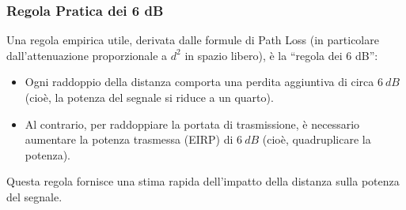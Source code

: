 \subsubsection{Regola Pratica dei 6 dB}
Una regola empirica utile, derivata dalle formule di Path Loss (in particolare dall'attenuazione proporzionale a $d^2$ in spazio libero), è la ``regola dei 6 dB'':
\begin{itemize}
    \item Ogni raddoppio della distanza comporta una perdita aggiuntiva di circa $\SI{6}{dB}$ (cioè, la potenza del segnale si riduce a un quarto).
    \item Al contrario, per raddoppiare la portata di trasmissione, è necessario aumentare la potenza trasmessa (EIRP) di $\SI{+6}{dB}$ (cioè, quadruplicare la potenza).
\end{itemize}
Questa regola fornisce una stima rapida dell'impatto della distanza sulla potenza del segnale.

